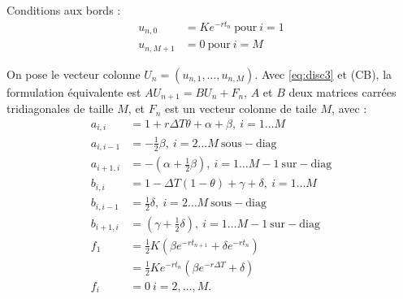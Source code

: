 \documentclass[a4paper, 11pt]{article}
\renewcommand{\(}{\left (}
\renewcommand{\)}{\right )}
\newcommand{\uni}[2]{u_{{#1},{#2}}}
\begin{document}
Conditions aux bords :
\begin{align*}
  \uni{n}{0}   & = Ke^{-rt_n} \mathrm{\ pour\ } i = 1 \\
  \uni{n}{M+1} &= 0 \mathrm{\ pour\ } i = M
\end{align*}

On pose le vecteur colonne $U_n=(\uni{n}{1},\ldots,\uni{n}{M})$. Avec \eqref{eq:disc3} et
(CB), la formulation \'equivalente est $AU_{n+1}=BU_n+F_n$, $A$ et $B$
deux matrices carr\'ees tridiagonales de taille $M$, et $F_n$ est un vecteur colonne
de taile $M$, avec :
\begin{align*}
  a_{i,i}  & = 1+r\Delta T\theta + \alpha + \beta,\ i=1\ldots M \\
  a_{i,i-1} & = -\frac{1}{2} \beta,\ i=2\ldots M\ \mathrm{sous-diag} \\
  a_{i+1,i} & = -\(\alpha + \frac{1}{2} \beta\),\ i=1\ldots M-1\ \mathrm{sur-diag} \\
  b_{i,i}  & = 1-\Delta T(1-\theta) + \gamma + \delta,\ i=1\ldots M \\
  b_{i,i-1} & = \frac{1}{2} \delta,\ i=2\ldots M\ \mathrm{sous-diag} \\
  b_{i+1,i} & = \(\gamma + \frac{1}{2} \delta\),\ i=1\ldots M-1\
              \mathrm{sur-diag} \\
  f_1 & = \frac{1}{2}K\(\beta e^{-rt_{n+1}} + \delta e^{-rt_n}\) \\
      & = \frac{1}{2}Ke^{-rt_n}\(\beta e^{-r\Delta T} + \delta\) \\
  f_i & = 0 \ i=2,\ldots,M.
\end{align*}
\end{document}
